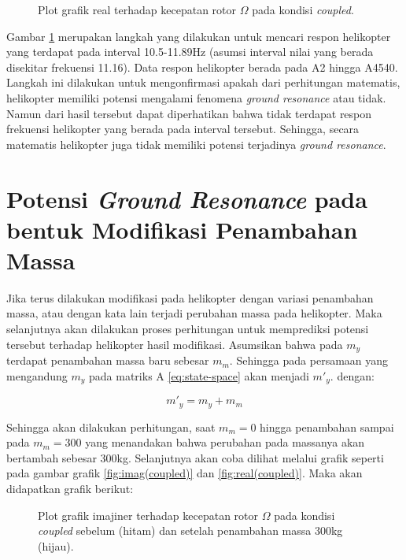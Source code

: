 \begin{figure}[H]
	\centering
	\caption{Plot grafik real terhadap kecepatan rotor $\Omega$ pada kondisi \textit{coupled}.}
	\label{fig:resonance_range}
\end{figure}

Gambar \ref{fig:resonance_range} merupakan langkah yang dilakukan untuk mencari respon helikopter yang terdapat pada interval 10.5-11.89Hz (asumsi interval nilai yang berada disekitar frekuensi 11.16). Data respon helikopter berada pada A2 hingga A4540. Langkah ini dilakukan untuk mengonfirmasi apakah dari perhitungan matematis, helikopter memiliki potensi mengalami fenomena \textit{ground resonance} atau tidak. Namun dari hasil tersebut dapat diperhatikan bahwa tidak terdapat respon frekuensi helikopter yang berada pada interval tersebut. Sehingga, secara matematis helikopter juga tidak memiliki potensi terjadinya \textit{ground resonance}.

\section{Potensi \textit{Ground Resonance} pada bentuk Modifikasi Penambahan Massa}

Jika terus dilakukan modifikasi pada helikopter dengan variasi penambahan massa, atau dengan kata lain terjadi perubahan massa pada helikopter. Maka selanjutnya akan dilakukan proses perhitungan untuk memprediksi potensi tersebut terhadap helikopter hasil modifikasi. Asumsikan bahwa pada $m_y$ terdapat penambahan massa baru sebesar $m_m$. Sehingga pada persamaan yang mengandung $m_y$ pada matriks A \ref{eq:state-space} akan menjadi $m'_y$. dengan:

\begin{equation}
	\label{eq:modified}
	m'_y=m_y+m_m
\end{equation}

Sehingga akan dilakukan perhitungan, saat $m_m = 0$ hingga penambahan sampai pada $m_m = 300$ yang menandakan bahwa perubahan pada massanya akan bertambah sebesar 300kg. Selanjutnya akan coba dilihat melalui grafik seperti pada gambar grafik \ref{fig:imag(coupled)} dan \ref{fig:real(coupled)}. Maka akan didapatkan grafik berikut:

\begin{figure}[H]
	\centering
	\caption{Plot grafik imajiner terhadap kecepatan rotor $\Omega$ pada kondisi \textit{coupled} sebelum (hitam) dan setelah penambahan massa 300kg (hijau).}
	\label{fig:imag(modified)_1}
\end{figure}

